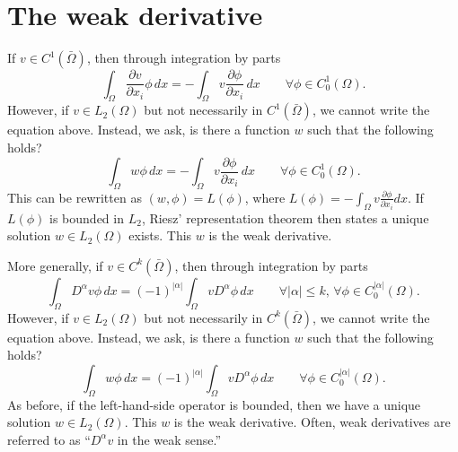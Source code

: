 \documentclass[oneside,a4paper,11pt]{report}
\begin{document}
\section{The weak derivative}
If $v \in C^1(\bar{\Omega})$, then through integration by parts
\begin{equation}
    \int_\Omega \frac{\partial v}{\partial x_i} \phi \, dx = -\int_\Omega v \frac{\partial \phi}{\partial x_i} \, dx \qquad \forall \phi \in C_0^1(\Omega).
\end{equation}
However, if $v \in L_2(\Omega)$ but not necessarily in $C^1(\bar{\Omega})$, we cannot write the equation above. Instead, we ask, is there a function $w$ such that the following holds?
\begin{equation}
     \int_\Omega w \phi \, dx = -\int_\Omega v \frac{\partial \phi}{\partial x_i} \, dx \qquad \forall \phi \in C_0^1(\Omega).
\end{equation}
This can be rewritten as $(w,\phi) = L(\phi)$, where $L(\phi) = -\int_\Omega v \frac{\partial \phi}{\partial x_i}dx$. If $L(\phi)$ is bounded in $L_2$, Riesz' representation theorem then states a unique solution $w \in L_2(\Omega)$ exists. This $w$ is the weak derivative.

More generally, if $v \in C^k(\bar{\Omega})$, then through integration by parts
\begin{equation}
    \int_\Omega D^\alpha v \phi \, dx = (-1)^{|\alpha|} \int_\Omega v D^\alpha \phi \, dx \qquad \forall |\alpha| \le k,\, \forall \phi \in C_0^{|\alpha|}(\Omega).
\end{equation}
However, if $v \in L_2(\Omega)$ but not necessarily in $C^k(\bar{\Omega})$, we cannot write the equation above. Instead, we ask, is there a function $w$ such that the following holds?
\begin{equation}
    \int_\Omega w \phi \, dx = (-1)^{|\alpha|} \int_\Omega v D^\alpha \phi \, dx \qquad \forall \phi \in C_0^{|\alpha|}(\Omega).
\end{equation}
As before, if the left-hand-side operator is bounded, then we have a unique solution $w \in L_2(\Omega)$. This $w$ is the weak derivative. Often, weak derivatives are referred to as ``$D^\alpha v$ in the weak sense.''

\end{document}

